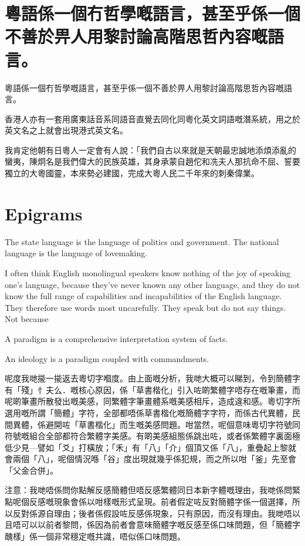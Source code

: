 \documentclass[a5paper, 10pt, openany]{book} %
\begin{document}
\chapter{粵語係一個冇哲學嘅語言，甚至乎係一個不善於畀人用黎討論高階思哲內容嘅語言。}
粵語係一個冇哲學嘅語言，甚至乎係一個不善於畀人用黎討論高階思哲內容嘅語言。


香港人亦有一套用廣東話音系同語音直覺去同化同粵化英文詞語嘅潛系統，用之於英文名之上就會出現港式英文名。



我肯定他朝有日粵人一定會有人說：「我們自古以來就是天朝最忠誠地添煩添亂的蠻夷，陳炯名是我們偉大的民族英雄，其身承蒙自趙佗和冼夫人那抗命不屈、誓要獨立的大粵國靈，本來勢必建國，完成大粵人民二千年來的刺秦偉業。

\chapter{Epigrams}
The state language is the language of politics and government. The national language is the language of lovemaking.



I often think English monolingual speakers know nothing of the joy of speaking one’s language, because they’ve never known any other language, and they do not know the full range of capabilities and incapabilities of the English language. They therefore use words most uncarefully. They speak but do not say things. Not because



A paradigm is a comprehensive interpretation system of facts.

An ideology is a paradigm coupled with commandments.



呢度我哋㨢一㨢返去粵切字嗰度。由上面嘅分析，我哋大概可以睇到，令到簡體字有「殘」忄夫么．嘅核心原因，係「草書楷化」引入咗啲繁體字唔存在嘅筆畫，而呢啲筆畫所散發出嘅美感，同繁體字筆畫體系嘅美感相斥，造成違和感。粵切字所選用嘅所謂「簡體」字符，全部都唔係草書楷化嘅簡體字字符，而係古代異體，民間異體，係避開咗「草書楷化」而生嘅美感問題。咁當然，呢個意味粵切字符號同符號嘅組合全部都符合繁體字美感。有啲美感組態係跳出咗，或者係繁體字裏面極低少見—譬如「爻」打橫放；「禾」有「八」「介」個頂又係「八」，重疊起上黎就會兩個「八」，呢個情況喺「谷」度出現就幾乎係犯規，而之所以咁「釜」先至會「父金合併」。


注意：我哋唔係問你點解反感簡體但唔反感繁體同日本新字體嘅理由，我哋係問緊點呢個反感嘅現象會係以咁樣嘅形式呈現。前者假定咗反對簡體字係一個選擇，所以反對係源自理由；後者係假設咗反感係現象，只有原因，而沒有理由。我哋唔以且唔可以以前者黎問，係因為前者會意味簡體字嘅反感至係口味問題，但「簡體字醜樣」係一個非常穩定嘅共識，唔似係口味問題。
\end{document}
